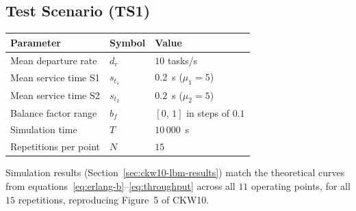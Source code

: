 \subsection*{Test Scenario (TS1)}

\begin{center}
\begin{tabular}{lll}
  \hline
  Parameter & Symbol & Value \\
  \hline
  Mean departure rate & $d_r$ & $10$ tasks/s \\
  Mean service time S1 & $s_{t_1}$ & $0.2$~s ($\mu_1 = 5$) \\
  Mean service time S2 & $s_{t_2}$ & $0.2$~s ($\mu_2 = 5$) \\
  Balance factor range & $b_f$ & $[0,\,1]$ in steps of $0.1$ \\
  Simulation time & $T$ & $10\,000$~s \\
  Repetitions per point & $N$ & $15$ \\
  \hline
\end{tabular}
\end{center}

Simulation results (Section~\ref{sec:ckw10-lbm-results}) match the
theoretical curves from equations~\eqref{eq:erlang-b}--\eqref{eq:throughput}
across all $11$ operating points, for all $15$ repetitions, reproducing
Figure~5 of CKW10.

